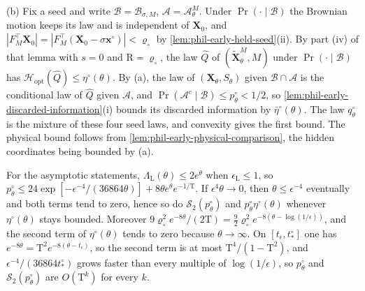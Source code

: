(b) Fix a seed and write \(\mathscr B=\mathscr B_{\sigma,M}\),
\(\mathscr A=\mathscr A^M_\theta\). Under \(\Pr(\cdot\mid\mathscr B)\) the
Brownian motion keeps its law and is independent of \(\mathbf X_0\), and
\(|F_M^\top\mathbf X_0|=|F_M^\top(\mathbf X_0-\sigma\mathbf x^\circ)|<\varrho_\circ\)
by \cref{lem:phil-early-held-seed}(ii). By part (iv) of that lemma with
\(s=0\) and \(\mathrm R=\varrho_\circ\), the law \(\widehat Q\) of
\((\widetilde{\mathbf X}^M_\theta,M)\) under \(\Pr(\cdot\mid\mathscr B)\)
has \(\mathcal H_{\mathrm{opt}}(\widehat Q)\le\eta^\circ(\theta)\). By (a),
the law of \((\mathbf X_\theta,S_\theta)\) given
\(\mathscr B\cap\mathscr A\) is the conditional law of \(\widehat Q\) given
\(\mathscr A\), and \(\Pr(\mathscr A^c\mid\mathscr B)\le p^\circ_\theta<1/2\),
so \cref{lem:phil-early-discarded-information}(i) bounds its discarded
information by \(\bar\eta^\circ(\theta)\). The law \(q^\circ_\theta\) is the
mixture of these four seed laws, and convexity gives the first bound. The
physical bound follows from \cref{lem:phil-early-physical-comparison}, the
hidden coordinates being bounded by (a).

For the asymptotic statements, \(\Lambda_{\mathrm L}(\theta)\le2e^\theta\)
when \(\epsilon_{\mathrm L}\le1\), so
\(p^\circ_\theta\le24\exp[-\epsilon^{-4}/(36864\theta)]
+8\theta e^{\theta}e^{-1/\mathrm T}\). If \(\epsilon^4\theta\to0\), then
\(\theta\le\epsilon^{-4}\) eventually and both terms tend to zero, hence so
do \(\mathcal S_2(p^\circ_\theta)\) and
\(p^\circ_\theta\eta^\circ(\theta)\) whenever \(\eta^\circ(\theta)\) stays
bounded. Moreover
\(9\varrho_\circ^2e^{-8\theta}/(2\mathrm T)
=\frac92\varrho_\circ^2e^{-8(\theta-\log(1/\epsilon))}\), and the second
term of \(\eta^\circ(\theta)\) tends to zero because \(\theta\to\infty\). On
\([t_\epsilon,t^\circ_*]\) one has \(e^{-8\theta}=\mathrm T^2
e^{-8(\theta-t_\epsilon)}\), so the second term is at most
\(\mathrm T^4/(1-\mathrm T^2)\), and
\(\epsilon^{-4}/(36864t^\circ_*)\) grows faster than every multiple of
\(\log(1/\epsilon)\), so \(p^\circ_\theta\) and
\(\mathcal S_2(p^\circ_\theta)\) are \(O(\mathrm T^k)\) for every \(k\).

